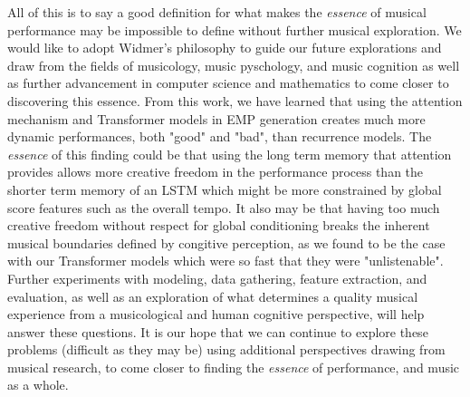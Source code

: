All of this is to say a good definition for what makes the \emph{essence} of musical performance may be impossible to define without further musical exploration. We would like to adopt Widmer's philosophy to guide our future explorations and draw from the fields of musicology, music pyschology, and music cognition as well as further advancement in computer science and mathematics to come closer to discovering this essence. From this work, we have learned that using the attention mechanism and Transformer models in EMP generation creates much more dynamic performances, both "good" and "bad", than recurrence models. The \emph{essence} of this finding could be that using the long term memory that attention provides allows more creative freedom in the performance process than the shorter term memory of an LSTM which might be more constrained by global score features such as the overall tempo. It also may be that having too much creative freedom without respect for global conditioning breaks the inherent musical boundaries defined by congitive perception, as we found to be the case with our Transformer models which were so fast that they were "unlistenable". Further experiments with modeling, data gathering, feature extraction, and evaluation, as well as an exploration of what determines a quality musical experience from a musicological and human cognitive perspective, will help answer these questions. It is our hope that we can continue to explore these problems (difficult as they may be) using additional perspectives drawing from musical research, to come closer to finding the \emph{essence} of performance, and music as a whole. 
